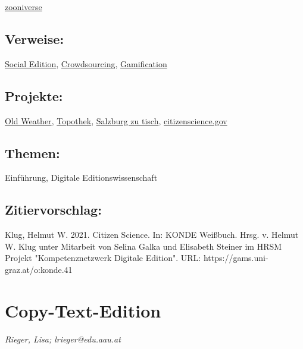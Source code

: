\documentclass{article}
\begin{document}
\href{https://www.zooniverse.org/}{zooniverse}\subsection*{Verweise:}\href{https://gams.uni-graz.at/o:konde.169}{Social Edition}, \href{https://gams.uni-graz.at/o:konde.47}{Crowdsourcing}, \href{https://gams.uni-graz.at/o:konde.89}{Gamification}\subsection*{Projekte:}\href{https://www.oldweather.org}{Old Weather}, \href{https://www.topothek.at/de/}{Topothek}, \href{http://gastrosophie.sbg.ac.at/salzburg-zu-tisch/}{Salzburg zu tisch}, \href{https://www.citizenscience.gov/#}{citizenscience.gov}\subsection*{Themen:}Einführung, Digitale Editionswissenschaft\subsection*{Zitiervorschlag:}Klug, Helmut W. 2021. Citizen Science. In: KONDE Weißbuch. Hrsg. v. Helmut W. Klug unter Mitarbeit von Selina Galka und Elisabeth Steiner im HRSM Projekt "Kompetenznetzwerk Digitale Edition". URL: https://gams.uni-graz.at/o:konde.41\newpage\section*{Copy-Text-Edition} \emph{Rieger, Lisa; lrieger@edu.aau.at }\\
        
\end{document}

